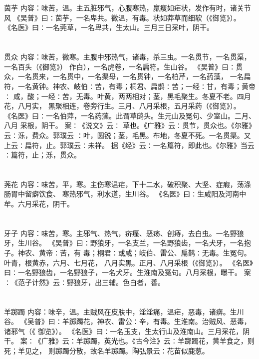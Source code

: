 \documentclass[12pt,UTF8]{ctexbook}
\begin{document}
\chapter{}茵芋
内容：味苦，温。主五脏邪气，心腹寒热，羸瘦如疟状，发作有时，诸关节风 
《吴普》曰∶茵芋，一名卑共。微温，有毒。状如莽草而细软（《御览》）。 
《名医》曰∶一名莞草，一名卑共，生太山。三月三日采叶，阴干。 


\chapter{}贯众
内容：味苦，微寒。主腹中邪热气，诸毒，杀三虫。一名贯节，一名贯渠，一名百头（《御览》） 
作白），一名虎卷，一名扁符。生山谷。 
《吴普》曰∶贯众，一名贯来，一名贯中，一名渠母，一名贯钟，一名柏芹，一名药藻， 
一名扁符，一名黄钟。神农、岐伯∶苦，有毒；桐君、扁鹊∶苦；一经∶甘，有毒；黄帝∶ 
咸，酸；一经∶苦，无毒。叶黄，两两相对；茎，黑毛聚生。冬夏不老。四月花，八月实， 
黑聚相连，卷旁行生。三月、八月采根，五月采药（《御览》）。 
《名医》曰∶一名伯萍，一名药藻。此谓草鸱头。生元山及冤句、少室山。二月、八月 
采根，阴干。 
案∶《说文》云∶ 草也。《广雅》云∶贯节，贯众也。《尔雅》云∶泺，费众。郭璞云 
∶叶，圆锐；茎，毛黑。布地，冬夏不死。一名贯渠。又上云∶扁符，止。郭璞云∶未祥。 
据《经》云∶一名篇符，即此也。《尔雅》当云∶篇符，止；泺，贯众。 


\chapter{}荛花
内容：味苦，平，寒。主伤寒温疟，下十二水，破积聚、大坚、症瘕，荡涤肠胃中留癖饮食、 
寒热邪气，利水道，生川谷。 
《名医》曰∶生咸阳及河南中牟。六月采花，阴干。 


\chapter{}牙子
内容：味苦，寒。主邪气、热气，疥瘙、恶疡、创痔，去白虫。一名野狼牙，生川谷。 
《吴普》曰∶野狼牙，一名支兰，一名野狼齿，一名犬牙，一名抱子。神农、黄帝∶苦，有 
毒；桐君∶或咸；岐伯、雷公、扁鹊∶无毒。生冤句。叶青，根黄赤，六月、七月花， 
八月实黑。正月、八月采根（《御览》）。 
《名医》曰∶一名野狼齿，一名野狼子，一名犬牙。生淮南及冤句。八月采根，曝干。 
案∶《范子计然》云∶野狼牙，出三辅。色白者，善。 


\chapter{}羊踯躅
内容：味辛，温。主贼风在皮肤中，淫淫痛，温疟，恶毒，诸痹。生川谷。 
《吴普》曰∶羊踯躅花，神农、雷公∶辛，有毒。生淮南。治贼风、恶毒，诸邪气（《 
御览》）。 
《名医》曰∶一名玉支，生太行山及淮南山。三月采花，阴干。 
案∶《广雅》云∶羊踯躅，英光也。《古今注》云∶羊踯躅花，黄羊食之，则死；羊见之， 
则踯躅分散，故名羊踯躅。陶弘景云∶花苗似鹿葱。 
\end{document}
